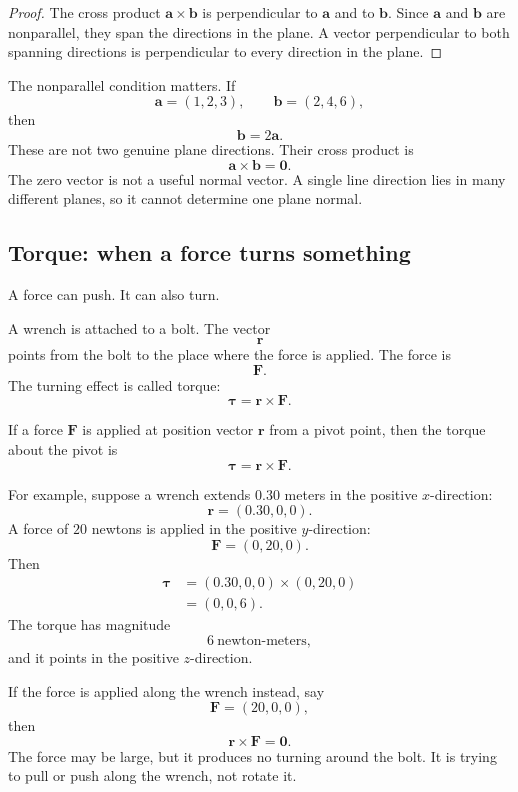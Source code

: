 \begin{proof}
The cross product \(\mathbf a\times\mathbf b\) is perpendicular to \(\mathbf a\) and
to \(\mathbf b\).  Since \(\mathbf a\) and \(\mathbf b\) are nonparallel, they span the
directions in the plane.  A vector perpendicular to both spanning directions is
perpendicular to every direction in the plane.
\end{proof}

The nonparallel condition matters.  If
\[
    \mathbf a=(1,2,3),
    \qquad
    \mathbf b=(2,4,6),
\]
then
\[
    \mathbf b=2\mathbf a.
\]
These are not two genuine plane directions.  Their cross product is
\[
    \mathbf a\times\mathbf b=\mathbf 0.
\]
The zero vector is not a useful normal vector.  A single line direction lies in many
different planes, so it cannot determine one plane normal.

\subsection{Torque: when a force turns something}

A force can push.  It can also turn.

A wrench is attached to a bolt.  The vector
\[
    \mathbf r
\]
points from the bolt to the place where the force is applied.  The force is
\[
    \mathbf F.
\]
The turning effect is called torque:
\[
    \boldsymbol\tau=\mathbf r\times\mathbf F.
\]

\begin{definition}[Torque]
If a force \(\mathbf F\) is applied at position vector \(\mathbf r\) from a pivot point,
then the torque about the pivot is
\[
\boxed{
    \boldsymbol\tau=\mathbf r\times\mathbf F.
}
\]
\end{definition}

For example, suppose a wrench extends \(0.30\) meters in the positive \(x\)-direction:
\[
    \mathbf r=(0.30,0,0).
\]
A force of \(20\) newtons is applied in the positive \(y\)-direction:
\[
    \mathbf F=(0,20,0).
\]
Then
\[
\begin{aligned}
\boldsymbol\tau
&=
(0.30,0,0)\times(0,20,0)\\
&=
(0,0,6).
\end{aligned}
\]
The torque has magnitude
\[
    6\ \text{newton-meters},
\]
and it points in the positive \(z\)-direction.

If the force is applied along the wrench instead, say
\[
    \mathbf F=(20,0,0),
\]
then
\[
    \mathbf r\times\mathbf F=\mathbf 0.
\]
The force may be large, but it produces no turning around the bolt.  It is trying to pull
or push along the wrench, not rotate it.

